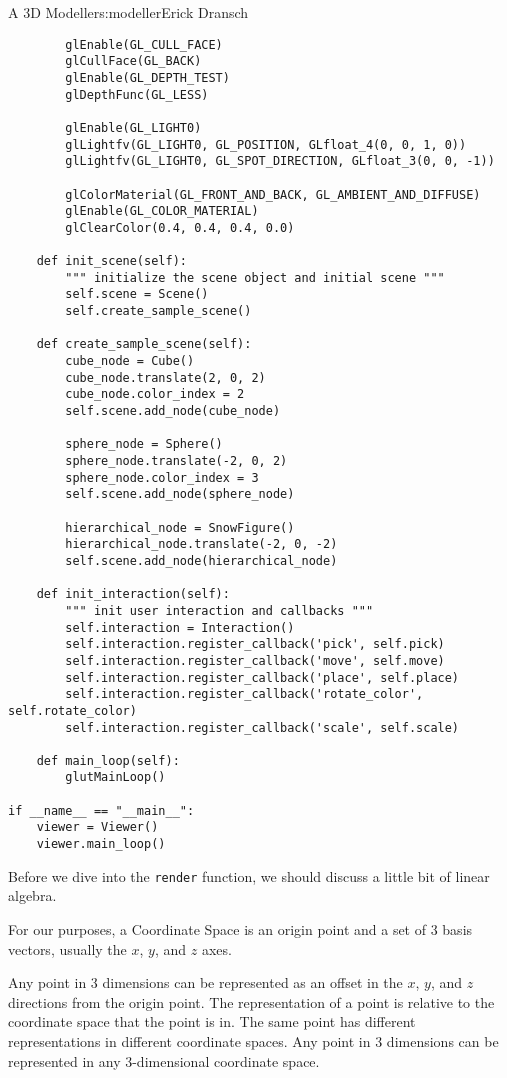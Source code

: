\begin{aosachapter}{A 3D Modeller}{s:modeller}{Erick Dransch}
\begin{verbatim}
        glEnable(GL_CULL_FACE)
        glCullFace(GL_BACK)
        glEnable(GL_DEPTH_TEST)
        glDepthFunc(GL_LESS)

        glEnable(GL_LIGHT0)
        glLightfv(GL_LIGHT0, GL_POSITION, GLfloat_4(0, 0, 1, 0))
        glLightfv(GL_LIGHT0, GL_SPOT_DIRECTION, GLfloat_3(0, 0, -1))

        glColorMaterial(GL_FRONT_AND_BACK, GL_AMBIENT_AND_DIFFUSE)
        glEnable(GL_COLOR_MATERIAL)
        glClearColor(0.4, 0.4, 0.4, 0.0)

    def init_scene(self):
        """ initialize the scene object and initial scene """
        self.scene = Scene()
        self.create_sample_scene()

    def create_sample_scene(self):
        cube_node = Cube()
        cube_node.translate(2, 0, 2)
        cube_node.color_index = 2
        self.scene.add_node(cube_node)

        sphere_node = Sphere()
        sphere_node.translate(-2, 0, 2)
        sphere_node.color_index = 3
        self.scene.add_node(sphere_node)

        hierarchical_node = SnowFigure()
        hierarchical_node.translate(-2, 0, -2)
        self.scene.add_node(hierarchical_node)

    def init_interaction(self):
        """ init user interaction and callbacks """
        self.interaction = Interaction()
        self.interaction.register_callback('pick', self.pick)
        self.interaction.register_callback('move', self.move)
        self.interaction.register_callback('place', self.place)
        self.interaction.register_callback('rotate_color', self.rotate_color)
        self.interaction.register_callback('scale', self.scale)

    def main_loop(self):
        glutMainLoop()

if __name__ == "__main__":
    viewer = Viewer()
    viewer.main_loop()
\end{verbatim}

Before we dive into the \texttt{render} function, we should discuss a
little bit of linear algebra.

\label{coordinate-space}

For our purposes, a Coordinate Space is an origin point and a set of 3
basis vectors, usually the $x$, $y$, and $z$ axes.

\label{point}

Any point in 3 dimensions can be represented as an offset in the $x$,
$y$, and $z$ directions from the origin point. The representation of a
point is relative to the coordinate space that the point is in. The same
point has different representations in different coordinate spaces. Any
point in 3 dimensions can be represented in any 3-dimensional coordinate
space.


\end{aosachapter}
